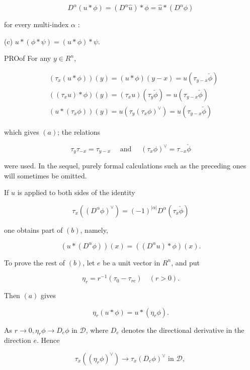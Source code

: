 \documentclass[10pt]{article}
\begin{document}
$$
D^{\alpha}(u * \phi)=\left(D^{\alpha} \hat{u}\right) * \phi=\hat{u} *\left(D^{\alpha} \phi\right)
$$

for every multi-index $\alpha$ :

(c) $u *(\phi * \psi)=(u * \phi) * \psi$.

PROof For any $y \in R^{n}$,

$$
\begin{aligned}
& \left(\tau_{x}(u * \phi)\right)(y)=(u * \phi)(y-x)=u\left(\tau_{y-x} \check{\phi}\right) \\
& \left(\left(\tau_{x} u\right) * \phi\right)(y)=\left(\tau_{x} u\right)\left(\tau_{y} \check{\phi}\right)=u\left(\tau_{y-x} \check{\phi}\right) \\
& \left(u *\left(\tau_{x} \phi\right)\right)(y)=u\left(\tau_{y}\left(\tau_{x} \phi\right)^{\vee}\right)=u\left(\tau_{y-x} \check{\phi}\right)
\end{aligned}
$$

which gives $(a)$; the relations

$$
\tau_{y} \tau_{-x}=\tau_{y-x} \quad \text { and } \quad\left(\tau_{x} \phi\right)^{\vee}=\tau_{-x} \check{\phi}
$$

were used. In the sequel, purely formal calculations such as the preceding ones will sometimes be omitted.

If $u$ is applied to both sides of the identity

$$
\tau_{x}\left(\left(D^{\alpha} \phi\right)^{\vee}\right)=(-1)^{|\alpha|} D^{\alpha}\left(\tau_{x} \check{\phi}\right)
$$

one obtains part of $(b)$, namely,

$$
\left(u *\left(D^{\alpha} \phi\right)\right)(x)=\left(\left(D^{\alpha} u\right) * \phi\right)(x) .
$$

To prove the rest of $(b)$, let $e$ be a unit vector in $R^{n}$, and put

$$
\eta_{r}=r^{-1}\left(\tau_{0}-\tau_{r e}\right) \quad(r>0) .
$$

Then $(a)$ gives

$$
\eta_{r}(u * \phi)=u *\left(\eta_{r} \phi\right) .
$$

As $r \rightarrow 0, \eta_{r} \phi \rightarrow D_{e} \phi$ in $\mathscr{D}$, where $D_{e}$ denotes the directional derivative in the direction $e$. Hence

$$
\tau_{x}\left(\left(\eta_{r} \phi\right)^{\vee}\right) \rightarrow \tau_{x}\left(D_{e} \phi\right)^{\vee} \text { in } \mathscr{D} \text {, }
$$
\end{document}
